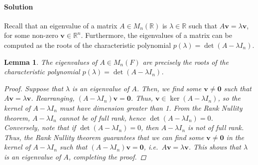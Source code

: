 \documentclass[10pt]{article}
\def\v{\bm{v}}
\def\det{\operatorname{det}}
\def\ker{\operatorname{ker}}
\newtheorem{lemma}{Lemma}
\begin{document}
        \paragraph{Solution}
        Recall that an eigenvalue of a matrix $A \in M_n(\mathbb{R})$ is $\lambda \in \mathbb{R}$ such that
        $A\v = \lambda\v$, for some non-zero $\v \in \mathbb{R}^n$. Furthermore, the eigenvalues of a matrix can be computed
        as the roots of the characteristic polynomial $p(\lambda) = \det(A - \lambda I_n)$.
        \begin{lemma}
                The eigenvalues of $A \in M_n(F)$ are precisely the roots of the characteristic polynomial $p(\lambda) = \det(A - \lambda I_n)$.
                \begin{proof}
                        Suppose that $\lambda$ is an eigenvalue of $A$. Then, we find some $\v \neq \mathbf{0}$ such that $A\v = \lambda\v$.
                        Rearranging, $(A - \lambda I_n)\v = \mathbf{0}$. Thus, $\v \in \ker(A - \lambda I_n)$, so the kernel of $A -\lambda I_n$ must
                        have dimension greater than 1. From the Rank Nullity theorem, $A - \lambda I_n$ cannot be of full rank, 
                        hence $\det(A - \lambda I_n) = 0$. \\

                        Conversely, note that if $\det(A - \lambda I_n) = 0$, then $A - \lambda I_n$ is not of full rank.
                        Thus, the Rank Nullity theorem guarantees that we can find some $\v \neq \mathbf{0}$ in the kernel of $A - \lambda I_n$
                        such that $(A - \lambda I_n)\v = \mathbf{0}$, i.e.\ $A\v = \lambda\v$. This shows that $\lambda$ is an eigenvalue of $A$, 
                        completing the proof.
                \end{proof}
        \end{lemma}
\end{document}
